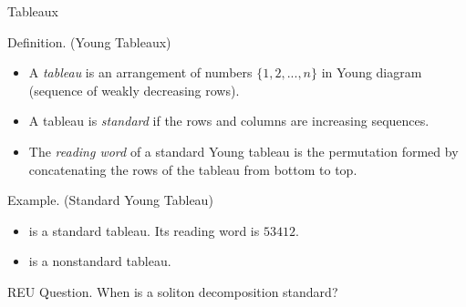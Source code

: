 \documentclass[aspectratio=169, serif]{beamer}
\begin{document}
\begin{frame}{Tableaux}
    \begin{block}{Definition. (Young Tableaux)}
        \begin{itemize}
        \small
            \item A \emph{tableau} 
            is an arrangement of numbers $\{1,2,...,n\}$ in Young diagram (sequence of weakly decreasing rows). \vspace{-0.25em}
            \item A tableau is \textit{standard} if the rows and columns are increasing 
 sequences. \vspace{-0.25em}
            \item The \textit{reading word} of a standard Young tableau is the permutation formed by concatenating the rows of the tableau from bottom to top.
        \end{itemize}
    \end{block}
    \begin{exampleblock}{Example. (Standard Young Tableau)}
        \begin{itemize}
        \item {} is a standard  tableau. Its reading word is $53412.$ %
        \item {} is a nonstandard tableau.
        \end{itemize}
        \vspace{-3.8pt}
    \end{exampleblock}

        \begin{block}{REU Question.}
    When is a soliton decomposition standard? 
    \end{block}    
    
\end{frame}
\end{document}
